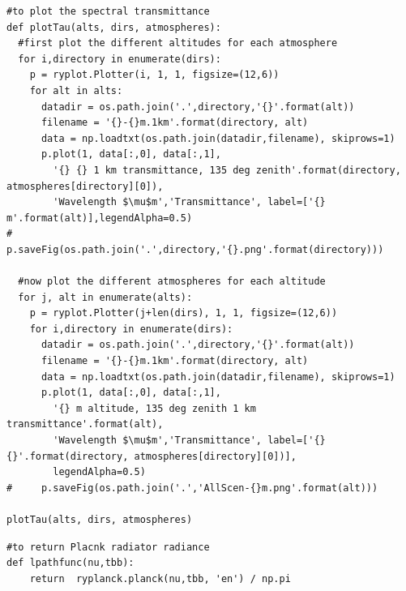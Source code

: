 \documentclass{workpackage}
\begin{document}
\begin{lstlisting}[style=incellstyle,caption={Code Listing in cell 17 \label{lst:autolistingcell17}}]
#to plot the spectral transmittance
def plotTau(alts, dirs, atmospheres):
  #first plot the different altitudes for each atmosphere
  for i,directory in enumerate(dirs):
    p = ryplot.Plotter(i, 1, 1, figsize=(12,6))
    for alt in alts:
      datadir = os.path.join('.',directory,'{}'.format(alt))
      filename = '{}-{}m.1km'.format(directory, alt)
      data = np.loadtxt(os.path.join(datadir,filename), skiprows=1)
      p.plot(1, data[:,0], data[:,1],
        '{} {} 1 km transmittance, 135 deg zenith'.format(directory, atmospheres[directory][0]),
        'Wavelength $\mu$m','Transmittance', label=['{} m'.format(alt)],legendAlpha=0.5)
#     p.saveFig(os.path.join('.',directory,'{}.png'.format(directory)))
    
  #now plot the different atmospheres for each altitude
  for j, alt in enumerate(alts):
    p = ryplot.Plotter(j+len(dirs), 1, 1, figsize=(12,6))
    for i,directory in enumerate(dirs):
      datadir = os.path.join('.',directory,'{}'.format(alt))
      filename = '{}-{}m.1km'.format(directory, alt)
      data = np.loadtxt(os.path.join(datadir,filename), skiprows=1)
      p.plot(1, data[:,0], data[:,1],
        '{} m altitude, 135 deg zenith 1 km transmittance'.format(alt),
        'Wavelength $\mu$m','Transmittance', label=['{} {}'.format(directory, atmospheres[directory][0])],
        legendAlpha=0.5)
#     p.saveFig(os.path.join('.','AllScen-{}m.png'.format(alt)))

plotTau(alts, dirs, atmospheres)
\end{lstlisting}


\begin{lstlisting}[style=incellstyle,caption={Code Listing in cell 20 \label{lst:autolistingcell20}}]
#to return Placnk radiator radiance
def lpathfunc(nu,tbb):
    return  ryplanck.planck(nu,tbb, 'en') / np.pi 
\end{lstlisting}
\end{document}

